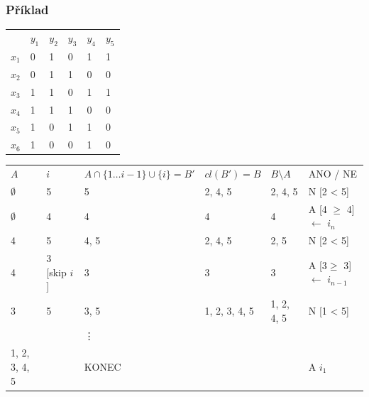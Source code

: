 \subsubsection*{Příklad}
\begin{table}[H]
	\centering
	\label{my-label}
	\begin{tabular}{l|lllll}
		 &  $y_1$& $y_2$ & $y_3$& $y_4$& $y_5$ \\\hhline
		$x_1$ &  0& 1 & 0 &  1& 1 \\
		$x_2$& 0 & 1 & 1 & 0 & 0 \\
		$x_3$& 1 & 1 &  0& 1 & 1 \\
		$x_4$& 1 & 1 & 1 & 0 & 0 \\
		$x_5$& 1 & 0 & 1 & 1 & 0 \\
		$x_6$& 1 & 0 & 0 &  1& 0
	\end{tabular}
\end{table}


\begin{tabular}{l|l|l|l|l|p{3cm}}
\multirow{2}{*}{$ A $} & \multirow{2}{*}{$ i $} & \multirow{2}{*}{$ A \cap \{1 \ldots i - 1\} \cup \{i\} = B' $ } & \multirow{2}{*}{$ cl(B') = B $ } & \multirow{2}{*}{$B \setminus A $  } & \multirow{2}{*}{ANO / NE }  \\
&&&&&\\ \hhline
$\emptyset$ & 5  & 5 &  2, 4, 5&  2, 4, 5&  N [2 < 5] \\
$\emptyset$ & 4  & 4 &  4&  4&  A [4 $\geq$ 4] $\leftarrow$ $i_n$ \\
4 & 5  & 4, 5 &  2, 4, 5&  2, 5&  N [2 < 5] \\
4 & 3 [skip $i$]  & 3 &  3&  3&  A [3$\geq$ 3] $\leftarrow$ $i_{n - 1}$ \\
3 & 5  & 3, 5 &  1, 2, 3, 4, 5&  1, 2, 4, 5&  N [1 < 5] \\
&&\vdots&&& \\
1, 2, 3, 4, 5&&KONEC&&&A $i_{1}$
\end{tabular}